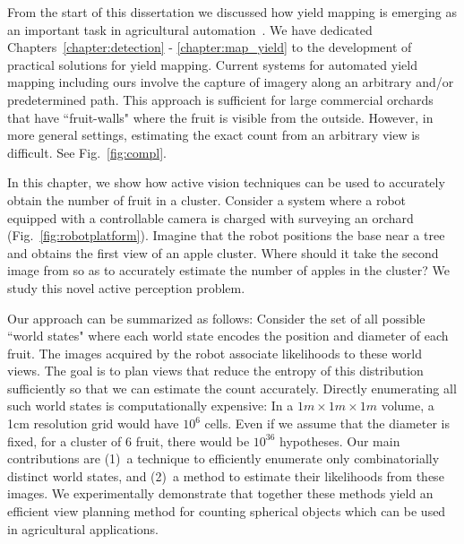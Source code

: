 
From the start of this dissertation we discussed how yield mapping is emerging as an important task in agricultural automation~\cite{hung2015feature,wang,das2015devices,deepApple,roy2016counting,roy2016surveying,peng2016semantic}. We have dedicated Chapters~\ref{chapter:detection} - \ref{chapter:map_yield} to the development of practical solutions for yield mapping. Current systems for automated yield mapping including ours involve the capture of imagery along an arbitrary and/or predetermined path. This approach is sufficient for large commercial orchards that have ``fruit-walls" where the fruit is visible from the outside. However, in more general settings, estimating the exact count from an arbitrary view is difficult. See Fig.~\ref{fig:compl}.


In this chapter, we show how active vision techniques can be used to accurately obtain the number of fruit in a cluster. Consider a system where a robot equipped with a controllable camera is charged with surveying an orchard (Fig.~\ref{fig:robotplatform}). Imagine that the robot positions the base near a tree and obtains the first view of an apple cluster. Where should it take the second image from so as to accurately estimate the number of apples in the cluster? We study this novel active perception problem.

Our approach can be summarized as follows: Consider the set of all possible ``world states" where each world state encodes the position and diameter of each fruit. The images acquired by the robot associate likelihoods to these world views. The goal is to plan views that reduce the entropy of this distribution sufficiently so that we can estimate the count accurately.  Directly enumerating all such world states is computationally expensive: In a $1m \times 1m \times 1m$ volume, a 1cm resolution grid would have $10^6$ cells. Even if we assume that the diameter is fixed, for a cluster of 6 fruit, there would be $10^{36}$ hypotheses. Our main contributions are (1)~a technique to efficiently enumerate only combinatorially distinct world states, and (2)~a method to estimate their likelihoods from these images. We experimentally demonstrate that together these methods yield an efficient view planning method for counting spherical objects which can be used in agricultural applications.



